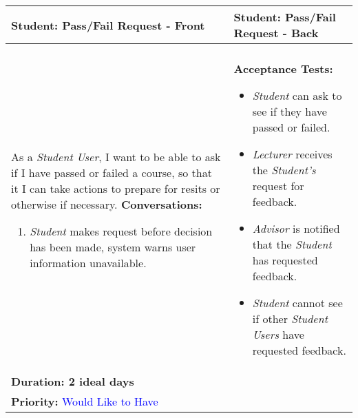 \documentclass[11pt]{article}
\begin{document}
\begin{center}
\begin{tabular}{ | m{8cm}  |  m{8cm}  | } 
 \hline
 \textbf{Student: Pass/Fail Request - Front} &  \textbf{Student: Pass/Fail Request - Back}  \\ 
  \hline
&\\[5pt]
As a \emph{Student User}, I want to be able to ask if I have passed or failed a course, so that it I can take actions to prepare for resits or otherwise if necessary.
\newline
\textbf{Conversations:}
\begin{enumerate}
\item{\emph{Student} makes request before decision has been made, system warns user information unavailable.}
\end{enumerate}
& \textbf{Acceptance Tests:} 
\begin{itemize}
\item{\emph{Student} can ask to see if they have passed or failed.}
\item{\emph{Lecturer} receives the \emph{Student's} request for feedback.}
\item{\emph{Advisor} is notified that the \emph{Student} has requested feedback.}
\item{\emph{Student} cannot see if other \emph{Student Users} have requested feedback.} 
\end{itemize} \\
\textbf{Duration: 2 ideal days} &\\
\textbf{Priority:}  \textcolor{blue}{Would Like to Have} & \\
 \hline
\end{tabular}
\end{center}

\end{document}
